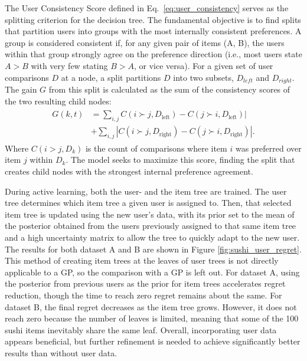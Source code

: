 \documentclass{article}
\begin{document}
The User Consistency Score defined in Eq.~\ref{eq:user_consistency} serves as the splitting criterion for the decision tree. The fundamental objective is to find splits that partition users into groups with the most internally consistent preferences. A group is considered consistent if, for any given pair of items (A, B), the users within that group strongly agree on the preference direction (i.e., most users state $A > B$ with very few stating $B > A$, or vice versa).
For a given set of user comparisons $D$ at a node, a split partitions $D$ into two subsets, $D_{left}$ and $D_{right}$. The gain $G$ from this split is calculated as the sum of the consistency scores of the two resulting child nodes:
\begin{align}\label{eq:user_consistency}
\begin{split}
G(k,t) &= \sum_{{i, j}}  C(i \succ j, D_{\text{left}}) - C(j \succ i, D_{\text{left}}) | \\ &+ \sum_{{i, j}} | C(i \succ j, D_{\text{right}}) - C(j \succ i, D_{\text{right}}) |.
\end{split}
\end{align}
Where $C(i>j,D_k)$  is the count of comparisons where item $i$ was preferred over item $j$ within $D_k$. The model seeks to maximize this score, finding the split that creates child nodes with the strongest internal preference agreement. 

During active learning, both the user- and the item tree are trained. The user tree determines which item tree a given user is assigned to. Then, that selected item tree is updated using the new user’s data, with its prior set to the mean of the posterior obtained from the users previously assigned to that same item tree and a high uncertainty matrix to allow the tree to quickly adapt to the new user. 
The results for both dataset A and B are shown in Figure \ref{fig:sushi_user_regret}. This method of creating item trees at the leaves of user trees is not directly applicable to a GP, so the comparison with a GP is left out. For dataset A, using the posterior from previous users as the prior for item trees accelerates regret reduction, though the time to reach zero regret remains about the same. For dataset B, the final regret decreases as the item tree grows. However, it does not reach zero because the number of leaves is limited, meaning that some of the 100 sushi items inevitably share the same leaf. Overall, incorporating user data appears beneficial, but further refinement is needed to achieve significantly better results than without user data.
\end{document}

